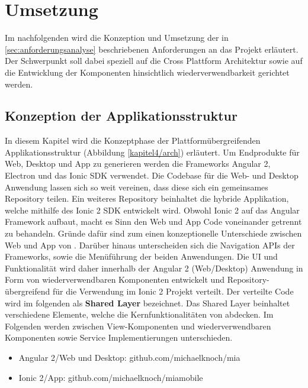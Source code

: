 
\chapter{Umsetzung}
\label{chap:umsetzung}

Im nachfolgenden wird die Konzeption und Umsetzung der in \ref{sec:anforderungsanalyse}
beschriebenen Anforderungen an das Projekt \projectname{} erläutert.
Der Schwerpunkt soll dabei speziell auf die Cross Plattform Architektur sowie auf die
Entwicklung der Komponenten hinsichtlich wiederverwendbarkeit gerichtet werden.


\section{Konzeption der Applikationsstruktur}

In diesem Kapitel wird die Konzeptphase der Plattformübergreifenden Applikationsstruktur (Abbildung \ref{kapitel4/arch}) erläutert.
Um Endprodukte für Web, Desktop und App zu generieren werden die Frameworks Angular 2, Electron und das
Ionic \ac{SDK} verwendet. Die Codebase für die Web- und Desktop Anwendung lassen sich so weit vereinen,
dass diese sich ein gemeinsames Repository teilen. Ein weiteres Repository beinhaltet die hybride Applikation,
welche mithilfe des Ionic 2 \ac{SDK} entwickelt wird. Obwohl Ionic 2 auf das Angular Framework aufbaut,
macht es Sinn den Web und App Code voneinander getrennt zu behandeln.
Gründe dafür sind zum einen konzeptionelle Unterschiede zwischen Web und App von \projectname{}.
Darüber hinaus unterscheiden sich die Navigation APIs der Frameworks, sowie die Menüführung der beiden Anwendungen.
Die \ac{UI} und Funktionalität wird daher innerhalb der Angular 2 (Web/Desktop)
Anwendung in Form von wiederverwendbaren Komponenten entwickelt und
Repository-übergreifend für die Verwendung im Ionic 2 Projekt verteilt.
Der verteilte Code wird im folgenden als \textbf{Shared Layer} bezeichnet.
Das Shared Layer beinhaltet verschiedene Elemente, welche die Kernfunktionalitäten von \projectname{} abdecken.
Im Folgenden werden zwischen View-Komponenten und wiederverwendbaren Komponenten sowie Service Implementierungen unterschieden.


\begin{itemize}
  \item Angular 2/Web und Desktop: github.com/michaelknoch/mia
  \item Ionic 2/App: github.com/michaelknoch/miamobile
\end{itemize}



